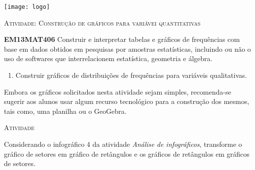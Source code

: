 \documentclass[10 pt,usenames,dvipsnames, oneside]{article}
\begin{document}
\begin{center}
  \begin{minipage}[l]{3cm}
\texttt{[image: logo]}    
\end{minipage}\hfill
\begin{minipage}[r]{.8\textwidth}
 {\Large \scshape Atividade: Construção de gráficos para variávei quantitativas}  
\end{minipage}
\end{center}
\vspace{.2cm}

\ifdefined\prof
\begin{objetivos}
\item \textbf{EM13MAT406} Construir e interpretar tabelas e gráficos de frequências com base em dados obtidos em pesquisas por amostras estatísticas, incluindo ou não o uso de softwares que interrelacionem estatística, geometria e álgebra.
\end{objetivos}

\begin{goals}
\begin{enumerate}
\item Construir gráficos de distribuições de frequências para variáveis qualitativas.
\end{enumerate}

\tcblower

Embora os gráficos solicitados nesta atividade sejam simples, recomenda-se sugerir aos alunos usar algum recurso tecnológico para a construção dos mesmos, tais como, uma planilha ou o GeoGebra.

\end{goals}

\bigskip
\begin{center}
{\large \scshape Atividade}
\end{center}
\fi

Considerando o infográfico 4 da atividade \textit{Análise de infográficos}, transforme o gráfico de setores em gráfico de retângulos e os gráficos de retângulos em gráficos de setores.
\end{document}
